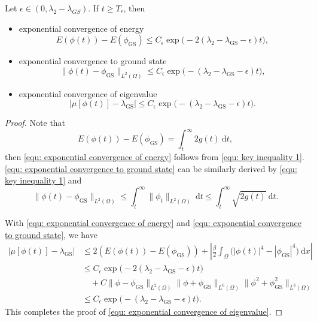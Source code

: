 \documentclass{siamart250211}
\begin{document}
\begin{theorem}\label{thm: exponential covergence}
	Let $\epsilon\in(0,\lambda_2 - \lambda_{GS}).$ If $t\ge T_\epsilon$, then
	\begin{itemize}
		\item exponential convergence of energy 
		\begin{equation}\label{equ: exponential convergence of energy}
		E(\phi(t)) - E(\phi_{\text{GS}}) \le C_{\epsilon} \exp\big(-2(\lambda_2 - \lambda_{\text{GS}} - \epsilon) t \big),
	\end{equation}
	\item exponential convergence to ground state 
	\begin{equation}\label{equ: exponential convergence to ground state}
		\|\phi(t) - \phi_{\text{GS}}\|_{L^2(\Omega)} \le C_{\epsilon} \exp\big(-(\lambda_2 - \lambda_{\text{GS}} - \epsilon) t \big),
	\end{equation}
	\item exponential convergence of eigenvalue
	\begin{equation}\label{equ: exponential convergence of eigenvalue}
		\left|\mu[\phi(t)] - \lambda_{\text{GS}}\right| \le C_{\epsilon} \exp\big(-(\lambda_2 - \lambda_{\text{GS}} - \epsilon) t \big).
	\end{equation}
	\end{itemize}
\end{theorem}
\begin{proof}
	Note that 
	\begin{equation*}
		E(\phi(t)) - E(\phi_{\text{GS}}) = \int_{t}^{\infty} 2g(t) \ \text{d}t,
	\end{equation*}
	then \eqref{equ: exponential convergence of energy} follows from \eqref{equ: key inequality 1}. \eqref{equ: exponential convergence to ground state} can be similarly derived by \eqref{equ: key inequality 1} and 
	\begin{equation*}
		\|\phi(t) - \phi_{\text{GS}}\|_{L^2(\Omega)} \le  \int_{t}^{\infty} \|\phi_t\|_{L^2(\Omega)} \ \text{d}t \le \int_{t}^{\infty} \sqrt{2 g(t)} \ \text{d}t. 
	\end{equation*} 
	
	With \eqref{equ: exponential convergence of energy} and \eqref{equ: exponential convergence to ground state}, we have 
	\begin{align*}
		|\mu[\phi(t)] - \lambda_{\text{GS}}| & \le 2(E(\phi(t)) - E(\phi_{\text{GS}})) + \left|\frac{\beta}{2} \int_{\Omega} \Big( |\phi(t)|^4 - |\phi_{\text{GS}}|^4 \Big) \ \text{d}x \right| \\
		& \le C_{\epsilon}\exp\big(-2(\lambda_2 - \lambda_{\text{GS}} - \epsilon) t \big) 
 \\
 & \quad + C \|\phi - \phi_{\text{GS}}\|_{L^2(\Omega)}\|\phi + \phi_{\text{GS}}\|_{L^6(\Omega)} \|\phi^2 + \phi_{\text{GS}}^2\|_{L^3(\Omega)} \\
		& \le C_{\epsilon}\exp\big(-(\lambda_2 - \lambda_{\text{GS}} - \epsilon) t \big).
	\end{align*}
This completes the proof of \eqref{equ: exponential convergence of eigenvalue}.
\end{proof}
\end{document}
